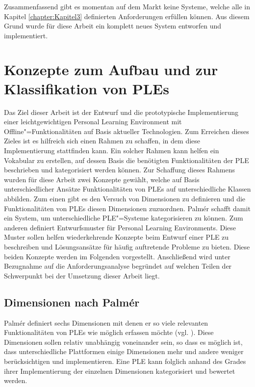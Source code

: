 Zusammenfassend gibt es momentan auf dem Markt keine Systeme, welche alle in Kapitel \ref{chapter:Kapitel3} definierten Anforderungen erfüllen können. Aus diesem Grund wurde für diese Arbeit ein komplett neues System entworfen und implementiert.

\section{Konzepte zum Aufbau und zur Klassifikation von PLEs}
Das Ziel dieser Arbeit ist der Entwurf und die prototypische Implementierung einer leichtgewichtigen Personal Learning Environment mit Offline"=Funktionalitäten auf Basis aktueller Technologien. Zum Erreichen dieses Zieles ist es hilfreich sich einen Rahmen zu schaffen, in dem diese Implementierung stattfinden kann. Ein solcher Rahmen kann helfen ein Vokabular zu erstellen, auf dessen Basis die benötigten Funktionalitäten der PLE  beschrieben und kategorisiert werden können. Zur Schaffung dieses Rahmens wurden für diese Arbeit zwei Konzepte gewählt, welche auf Basis unterschiedlicher Ansätze Funktionalitäten von PLEs auf unterschiedliche Klassen abbilden. Zum einen gibt es den Versuch von \cite{Palmer2009} Dimensionen zu definieren und die Funktionalitäten von PLEs diesen Dimensionen zuzuordnen. Palmér schafft damit ein System, um unterschiedliche PLE"=Systeme kategorisieren zu können. Zum anderen definiert \cite{Wilson2008} Entwurfsmuster für Personal Learning Environments. Diese Muster sollen helfen wiederkehrende Konzepte beim Entwurf einer PLE zu beschreiben und Lösungsansätze für häufig auftretende Probleme zu bieten. Diese beiden Konzepte werden im Folgenden vorgestellt. Anschließend wird unter Bezugnahme auf die Anforderungsanalyse begründet auf welchen Teilen der Schwerpunkt bei der Umsetzung dieser Arbeit liegt.

\subsection{Dimensionen nach Palmér}\label{section:dimensions_palmer} 
Palmér definiert sechs Dimensionen mit denen er so viele relevanten Funktionalitäten von PLEs wie möglich erfassen möchte (vgl. \cite{Palmer2009}). Diese Dimensionen sollen relativ unabhängig voneinander sein, so dass es möglich ist, dass unterschiedliche Plattformen einige Dimensionen mehr und andere weniger berücksichtigen und implementieren. Eine PLE kann folglich anhand des Grades ihrer Implementierung der einzelnen Dimensionen kategorisiert und bewertet werden.

